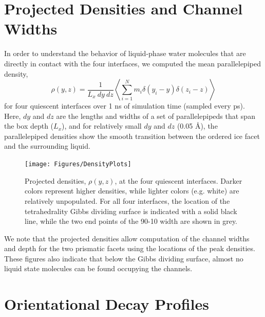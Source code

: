 \newpage

\section{Projected Densities and Channel Widths}

In order to understand the behavior of liquid-phase water molecules
that are directly in contact with the four interfaces, we computed the
mean parallelepiped density,
\begin{equation}
\rho(y, z) = \frac{1}{L_x~dy~dz} \left< \sum_{i = 1}^{N} m_i \delta(y_i - y) \delta(z_i - z)\right>
\end{equation}
for four quiescent interfaces over 1 ns of simulation time (sampled
every ps).  Here, $dy$ and $dz$ are the lengths and widths of a set of
parallelepipeds that span the box depth ($L_x$), and for relatively
small $dy$ and $dz$ (0.05 \AA), the parallelepiped densities show the
smooth transition between the ordered ice facet and the surrounding
liquid.

\begin{figure}
\texttt{[image: Figures/DensityPlots]}
\caption{\label{fig:DensPlots} Projected densities, $\rho(y, z)$, at
  the four quiescent interfaces.  Darker colors represent higher
  densities, while lighter colors (e.g. white) are relatively
  unpopulated.  For all four interfaces, the location of the
  tetrahedrality Gibbs dividing surface is indicated with a solid
  black line, while the two end points of the 90-10 width are shown in
  grey.}
\end{figure}

We note that the projected densities allow computation of the channel
widths and depth for the two prismatic facets using the locations of
the peak densities.  These figures also indicate that below the Gibbs
dividing surface, almost no liquid state molecules can be found
occupying the channels.


\newpage   
\section{Orientational Decay Profiles}


